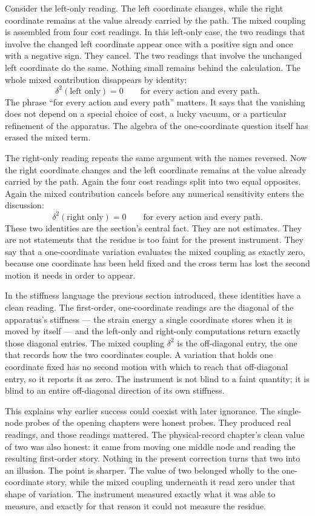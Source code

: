 Consider the left-only reading. The left coordinate changes, while the right
coordinate remains at the value already carried by the path. The mixed coupling
is assembled from four cost readings. In this left-only case, the two readings
that involve the changed left coordinate appear once with a positive sign and
once with a negative sign. They cancel. The two readings that involve the
unchanged left coordinate do the same. Nothing small remains behind the
calculation. The whole mixed contribution disappears by identity:
\[
  \delta^2(\text{left only}) = 0
  \qquad\text{for every action and every path.}
\]
The phrase ``for every action and every path'' matters. It says that the
vanishing does not depend on a special choice of cost, a lucky vacuum, or a
particular refinement of the apparatus. The algebra of the one-coordinate
question itself has erased the mixed term.

The right-only reading repeats the same argument with the names reversed. Now
the right coordinate changes and the left coordinate remains at the value
already carried by the path. Again the four cost readings split into two equal
opposites. Again the mixed contribution cancels before any numerical
sensitivity enters the discussion:
\[
  \delta^2(\text{right only}) = 0
  \qquad\text{for every action and every path.}
\]
These two identities are the section's central fact. They are not estimates.
They are not statements that the residue is too faint for the present
instrument. They say that a one-coordinate variation evaluates the mixed
coupling as exactly zero, because one coordinate has been held fixed and the
cross term has lost the second motion it needs in order to appear.

In the stiffness language the previous section introduced, these identities have
a clean reading. The first-order, one-coordinate readings are the diagonal of the
apparatus's stiffness --- the strain energy a single coordinate stores when it is
moved by itself --- and the left-only and right-only computations return exactly
those diagonal entries. The mixed coupling \(\delta^2\) is the off-diagonal entry,
the one that records how the two coordinates couple. A variation that holds one
coordinate fixed has no second motion with which to reach that off-diagonal entry,
so it reports it as zero. The instrument is not blind to a faint quantity; it is
blind to an entire off-diagonal direction of its own stiffness.

This explains why earlier success could coexist with later ignorance. The
single-node probes of the opening chapters were honest probes. They produced
real readings, and those readings mattered. The physical-record chapter's clean
value of two was also honest: it came from moving one middle node and reading
the resulting first-order story. Nothing in the present correction turns that
two into an illusion. The point is sharper. The value of two belonged wholly to
the one-coordinate story, while the mixed coupling underneath it read zero
under that shape of variation. The instrument measured exactly what it was able
to measure, and exactly for that reason it could not measure the residue.

